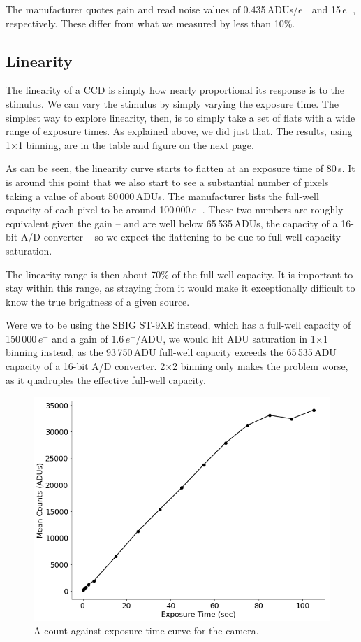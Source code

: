 \documentclass[12pt,letterpaper]{report}
\begin{document}
The manufacturer quotes gain and read noise values of 0.435$\,$ADUs/$e^-$ and 15$\,e^-$, respectively. These differ from what we measured by less than 10\%.

\subsection*{Linearity}

The linearity of a CCD is simply how nearly proportional its response is to the stimulus. We can vary the stimulus by simply varying the exposure time. The simplest way to explore linearity, then, is to simply take a set of flats with a wide range of exposure times. As explained above, we did just that. The results, using 1$\times$1 binning, are in the table and figure on the next page.

As can be seen, the linearity curve starts to flatten at an exposure time of 80$\,$s. It is around this point that we also start to see a substantial number of pixels taking a value of about 50$\,$000$\,$ADUs. The manufacturer lists the full-well capacity of each pixel to be around 100$\,$000$\,e^-$. These two numbers are roughly equivalent given the gain -- and are well below 65$\,$535$\,$ADUs, the capacity of a 16-bit A/D converter -- so we expect the flattening to be due to full-well capacity saturation.

The linearity range is then about 70\% of the full-well capacity. It is important to stay within this range, as straying from it would make it exceptionally difficult to know the true brightness of a given source.

Were we to be using the SBIG ST-9XE instead, which has a full-well capacity of 150$\,$000$\,e^-$ and a gain of 1.6$\,e^-$/ADU, we would hit ADU saturation in 1$\times$1 binning instead, as the 93$\,$750$\,$ADU full-well capacity exceeds the 65$\,$535$\,$ADU capacity of a 16-bit A/D converter. 2$\times$2 binning only makes the problem worse, as it quadruples the effective full-well capacity.

\begin{figure}[H]
	\centering
	\includegraphics[width=0.8\linewidth]{linearity.png}
	\caption{A count against exposure time curve for the camera.}
	\label{fig:Linearity}
\end{figure}
\end{document}
